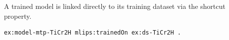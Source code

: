 A trained model is linked directly to its training dataset via the shortcut property.
\begin{lstlisting}[language=turtle]
ex:model-mtp-TiCr2H mlips:trainedOn ex:ds-TiCr2H .
\end{lstlisting}
